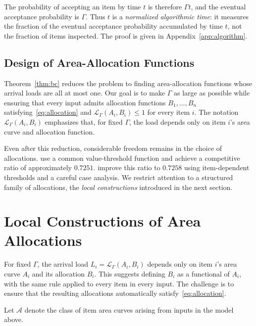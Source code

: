 \documentclass[11pt]{article}
\theoremstyle{definition}
\theoremstyle{remark}
\begin{document}
The probability of accepting an item by time $t$ is therefore $\Gamma t$, and the eventual acceptance probability is $\Gamma$.
Thus $t$ is a \emph{normalized algorithmic time}: it measures the fraction of the eventual acceptance probability accumulated by time $t$, not the fraction of items inspected.
The proof is given in Appendix~\ref{app:algorithm}.

\subsection{Design of Area-Allocation Functions}

Theorem~\ref{thm:bc} reduces the problem to finding area-allocation functions whose arrival loads are all at most one.
Our goal is to make $\Gamma$ as large as possible while ensuring that every input admits allocation functions $B_1,\ldots,B_n$ satisfying~\eqref{eq:allocation} and $\mathcal L_\Gamma(A_i,B_i)\le1$ for every item $i$.
The notation $\mathcal L_\Gamma(A_i,B_i)$ emphasizes that, for fixed $\Gamma$, the load depends only on item $i$'s area curve and allocation function.

Even after this reduction, considerable freedom remains in the choice of allocations.
\citet{PT} use a common value-threshold function and achieve a competitive ratio of approximately $0.7251$.
\citet{BC} improve this ratio to $0.7258$ using item-dependent thresholds and a careful case analysis.
We restrict attention to a structured family of allocations, the \emph{local constructions} introduced in the next section.


\section{Local Constructions of Area Allocations}\label{sec:local}

For fixed $\Gamma$, the arrival load $L_i=\mathcal L_\Gamma(A_i,B_i)$ depends only on item $i$'s area curve $A_i$ and its allocation $B_i$.
This suggests defining $B_i$ as a functional of $A_i$, with the same rule applied to every item in every input.
The challenge is to ensure that the resulting allocations automatically satisfy~\eqref{eq:allocation}.

Let $\mathcal A$ denote the class of item area curves arising from inputs in the model above.
\end{document}
